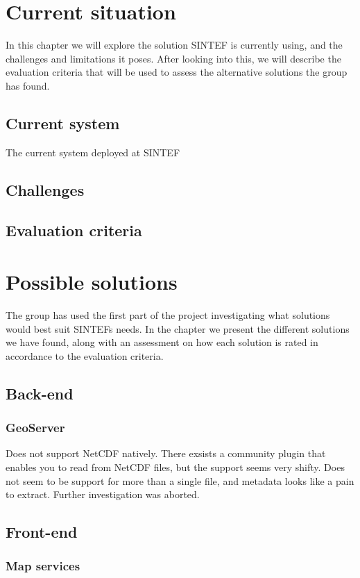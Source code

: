 \documentclass[11pt,a4paper,titlepage,oneside]{report}
\begin{document}
\chapter{Current situation}
In this chapter we will explore the solution SINTEF is currently using, and the challenges and limitations it poses. After looking into this, we will describe the evaluation criteria that will be used to assess the alternative solutions the group has found. 
\section{Current system}
The current system deployed at SINTEF 
\section{Challenges}
\section{Evaluation criteria}

\chapter{Possible solutions}
The group has used the first part of the project investigating what solutions would best suit SINTEFs needs. In the chapter we present the different solutions we have found, along with an assessment on how each solution is rated in accordance to the evaluation criteria. 

\section{Back-end}
\subsection{GeoServer}

Does not support NetCDF natively. There exsists a community plugin that enables you to read from NetCDF files, but the support seems very shifty. Does not seem to be support for more than a single file, and metadata looks like a pain to extract. Further investigation was aborted.

\section{Front-end}

  \subsection{Map services}
\end{document}
